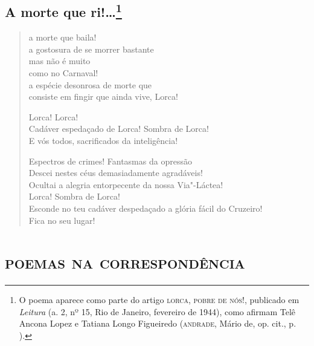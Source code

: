 \chapter{A morte que ri!\ldots{}\footnote[*]{O poema aparece como parte do artigo \textsc{lorca},
  \textsc{pobre de nós}!, publicado em \emph{Leitura} (a. 2, nº 15, Rio de
  Janeiro, fevereiro de 1944), como afirmam Telê Ancona Lopez e Tatiana
  Longo Figueiredo (\textsc{andrade}, Mário de, op. cit., p. ).}}

\begin{verse}
a morte que baila!\\
a gostosura de se morrer bastante\\
mas não é muito\\
como no Carnaval!\\
a espécie desonrosa de morte que\\
consiste em fingir que ainda vive, Lorca!

Lorca! Lorca!\\
Cadáver espedaçado de Lorca! Sombra de Lorca!\\
E vós todos, sacrificados da inteligência!

Espectros de crimes! Fantasmas da opressão\\
Descei nestes céus demasiadamente agradáveis!\\
Ocultai a alegria entorpecente da nossa Via"-Láctea!\\
Lorca! Sombra de Lorca!\\
Esconde no teu cadáver despedaçado a glória fácil do Cruzeiro!\\
Fica no seu lugar!
\end{verse}

\part{\textsc{poemas na correspondência}}



